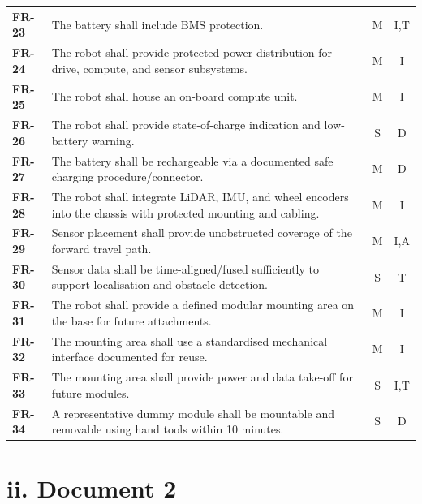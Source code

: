 \begin{longtable}{>{\bfseries}L{0.12\textwidth}L{0.65\textwidth}cc}
FR-23 & The battery shall include BMS protection. & M & I,T \\
FR-24 & The robot shall provide protected power distribution for drive, compute, and sensor subsystems. & M & I \\
FR-25 & The robot shall house an on-board compute unit. & M & I \\
FR-26 & The robot shall provide state-of-charge indication and low-battery warning. & S & D \\
FR-27 & The battery shall be rechargeable via a documented safe charging procedure/connector. & M & D \\
FR-28 & The robot shall integrate LiDAR, IMU, and wheel encoders into the chassis with protected mounting and cabling. & M & I \\
FR-29 & Sensor placement shall provide unobstructed coverage of the forward travel path. & M & I,A \\
FR-30 & Sensor data shall be time-aligned/fused sufficiently to support localisation and obstacle detection. & S & T \\
FR-31 & The robot shall provide a defined modular mounting area on the base for future attachments. & M & I \\
FR-32 & The mounting area shall use a standardised mechanical interface documented for reuse. & M & I \\
FR-33 & The mounting area shall provide power and data take-off for future modules. & S & I,T \\
FR-34 & A representative dummy module shall be mountable and removable using hand tools within 10 minutes. & S & D \\
\bottomrule
\end{longtable}

\section*{ii. Document 2}

